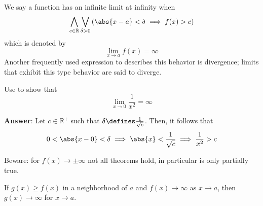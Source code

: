 \begin{definition}\label{def-infinite-limits}
	We say a function has an infinite limit at infinity when
	\begin{equation}
		\bigwedge_{c\in\mathbb{R}}\bigvee_{\delta>0}
		\left(\abs{x-a}<\delta \implies f(x)>c\right)
	\end{equation}
	which is denoted by
	\begin{equation}
		\lim_{x \to a}f(x)=\infty
	\end{equation}
	Another frequently used expression to describes this behavior is divergence;
	limits that exhibit this type behavior are said to diverge.
\end{definition}

\begin{exm}\label{exm-infinity-limit:3}
	Use  to show that
	\begin{equation}
		\lim_{x \to 0}\frac{1}{x^2}=\infty
	\end{equation}
	\begin{flushleft}
		\textbf{Answer}: Let $c\in\mathbb{R}^+$ such that $\delta\defines\tfrac{1}{\sqrt{c}}$.
		Then, it follows that
		\begin{equation*}
			0<\abs{x-0}<\delta \implies \abs{x} < \frac{1}{\sqrt{c}} \implies \frac{1}{x^2} > c
		\end{equation*}
	\end{flushleft}
\end{exm}

\begin{rem}
	Beware: for $f(x) \to \pm\infty$ not all theorems hold, in particular
	 is only partially true.
\end{rem}

\begin{thm}\label{thm-pizza-theorem}
	If $g(x) \geq f(x)$ in a neighborhood of $a$ and $f(x) \to \infty$ as $x \to a$,
	then $g(x) \to \infty$ for $x \to a$.
\end{thm}
